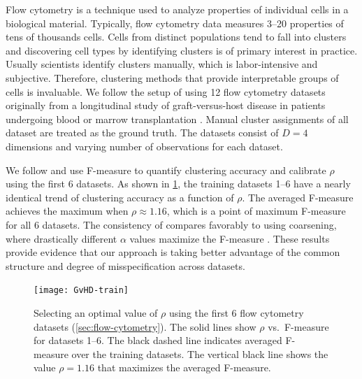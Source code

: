 Flow cytometry is a technique used to analyze properties of individual cells in a biological material.
Typically, flow cytometry data measures 3--20 properties of tens of thousands cells.
Cells from distinct populations tend to fall into clusters and discovering cell types by identifying clusters
is of primary interest in practice.
Usually scientists identify clusters manually, which is labor-intensive and subjective.
Therefore, clustering methods that provide interpretable groups of cells is invaluable.
We follow the setup of \citet{Miller:2019} using 12 flow cytometry datasets originally from a longitudinal study of graft-versus-host disease %
in patients undergoing blood or marrow transplantation \citep{Brinkman:2007}.
Manual cluster assignments of all dataset are treated as the ground truth.
The datasets consist of $D=4$ dimensions and varying number of observations for each dataset.

We follow \citet{Miller:2019} and use F-measure to quantify clustering accuracy and calibrate $\rho$ using the first 6 datasets.
As shown in \cref{fig:flowcyt-train}, the training datasets 1--6 have a nearly identical trend of
clustering accuracy as a function of $\rho$.
The averaged F-measure achieves the maximum when $\rho \approx 1.16$, which is a point of maximum F-measure for all 6 datasets.
The consistency of \methodname compares favorably to using coarsening, where drastically different $\alpha$ values maximize the F-measure \citep[Figure 5]{Miller:2019}.
These results provide evidence that our approach is taking better advantage of the common structure and degree of misspecification across datasets.

\begin{figure}[tp]
	\centering
	\texttt{[image: GvHD-train]}
	\caption{Selecting an optimal value of $\rho$ using the first 6 flow cytometry datasets (\cref{sec:flow-cytometry}).
		The solid lines show $\rho$ vs.\ F-measure for datasets 1--6.
		The black dashed line indicates averaged F-measure over the training datasets.
		The vertical black line shows the value $\rho = 1.16$ that maximizes the averaged F-measure.}
	\label{fig:flowcyt-train}
\end{figure}



